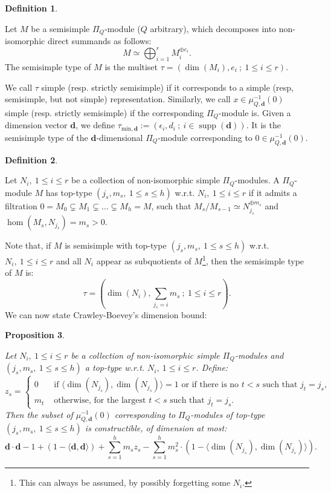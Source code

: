 \documentclass[11pt,english]{article}
\numberwithin{equation}{section}
\numberwithin{figure}{section}
\theoremstyle{definition}
\newtheorem{df}{Definition}[subsection]
\theoremstyle{plain}
\newtheorem{prop}[df]{Proposition}
\theoremstyle{remark}
\DeclareMathOperator{\supp}{supp}
\newcommand\dd{\mathbf{d}}
\begin{document}
\begin{df}{\cite[\S 1.]{CB01}}

Let $M$ be a semisimple $\Pi_{Q}$-module ($Q$ arbitrary), which
decomposes into non-isomorphic direct summands as follows:\[
M\simeq\bigoplus_{i=1}^rM_i^{\oplus e_i}.
\]The semisimple type of $M$ is the multiset $\tau=(\dim(M_{i}),e_{i}\ ;\ 1\leq i\leq r)$.

\end{df}

We call $\tau$ simple (resp. strictly semisimple) if it corresponds
to a simple (resp, semisimple, but not simple) representation. Similarly,
we call $x\in\mu_{Q,\dd}^{-1}(0)$ simple (resp. strictly semisimple)
if the corresponding $\Pi_{Q}$-module is. Given a dimension vector
$\dd$, we define $\tau_{\mathrm{min},\dd}:=(\epsilon_{i},d_{i}\ ;\ i\in\supp(\dd))$.
It is the semisimple type of the $\dd$-dimensional $\Pi_{Q}$-module
corresponding to $0\in\mu_{Q,\dd}^{-1}(0)$.

\begin{df}{\cite[\S 6.]{CB03a}}

Let $N_{i},\ 1\leq i\leq r$ be a collection of non-isomorphic simple
$\Pi_{Q}$-modules. A $\Pi_{Q}$-module $M$ has top-type $(j_{s},m_{s},\ 1\leq s\leq h)$
w.r.t. $N_{i},\ 1\leq i\leq r$ if it admits a filtration $0=M_{0}\subsetneq M_{1}\subsetneq\ldots\subsetneq M_{h}=M$,
such that $M_{s}/M_{s-1}\simeq N_{j_{s}}^{\oplus m_{s}}$ and $\hom(M_{s},N_{j_{s}})=m_{s}>0$.

\end{df}

Note that, if $M$ is semisimple with top-type $(j_{s},m_{s},\ 1\leq s\leq h)$
w.r.t. $N_{i},\ 1\leq i\leq r$ and all $N_{i}$ appear as subquotients
of $M$\footnote{This can always be assumed, by possibly forgetting some $N_{i}$.},
then the semisimple type of $M$ is:\[
\tau=\left(\dim(N_i),\sum_{j_s=i}m_s\ ;\ 1\leq i\leq r\right).
\]We can now state Crawley-Boevey's dimension bound:

\begin{prop}{\cite[Lem. 6.2.]{CB03a}} \label{Prop/CBDimBound}

Let $N_{i},\ 1\leq i\leq r$ be a collection of non-isomorphic simple
$\Pi_{Q}$-modules and $(j_{s},m_{s},\ 1\leq s\leq h)$ a top-type
w.r.t. $N_{i},\ 1\leq i\leq r$. Define:\[
z_s
=
\left\{
\begin{array}{ll}
0 & \text{ if }\langle\dim(N_{j_s}),\dim(N_{j_s})\rangle=1\text{ or if there is no }t<s\text{ such that } j_t=j_s, \\
m_t & \text{ otherwise, for the largest } t<s\text{ such that } j_t=j_s.
\end{array}
\right.
\]Then the subset of $\mu_{Q,\dd}^{-1}(0)$ corresponding to $\Pi_{Q}$-modules
of top-type $(j_{s},m_{s},\ 1\leq s\leq h)$ is constructible, of
dimension at most:\[
\dd\cdot\dd-1+(1-\langle\dd,\dd\rangle)+\sum_{s=1}^hm_sz_s-\sum_{s=1}^hm_s^2\cdot(1-\langle\dim(N_{j_s}),\dim(N_{j_s})\rangle).
\]\end{prop}
\end{document}
